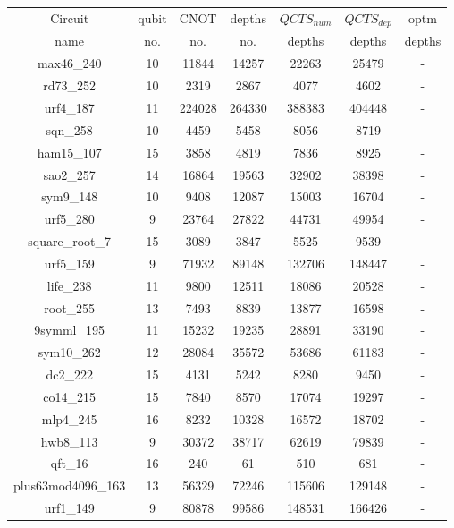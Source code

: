 \documentclass[runningheads]{llncs}
\begin{document}
								\begin{table}[H]
									\begin{center}  
									\begin{tabular}{|c|c|c|c|c|c|c|}
									\hline
									Circuit &  qubit  & CNOT &depths &$QCTS_{num}$& $QCTS_{dep}$  & optm 	  	\\
									 name	&   no. 	&	no. & no. & depths&  depths &  depths 	\\
									\hline
									max46\_240 & 10 & 11844 & 14257 & 22263 & 25479 & - \\
									rd73\_252 & 10 & 2319 & 2867 & 4077 & 4602 & - \\
									urf4\_187 & 11 & 224028 & 264330 & 388383 & 404448 & - \\
									sqn\_258 & 10 & 4459 & 5458 & 8056 & 8719 & - \\
									ham15\_107 & 15 & 3858 & 4819 & 7836 & 8925 & - \\
									sao2\_257 & 14 & 16864 & 19563 & 32902 & 38398 & - \\
									sym9\_148 & 10 & 9408 & 12087 & 15003 & 16704 & - \\
									urf5\_280 & 9 & 23764 & 27822 & 44731 & 49954 & - \\
									square\_root\_7 & 15 & 3089 & 3847 & 5525 & 9539 & - \\
									urf5\_159 & 9 & 71932 & 89148 & 132706 & 148447 & - \\
									life\_238 & 11 & 9800 & 12511 & 18086 & 20528 & - \\
									root\_255 & 13 & 7493 & 8839 & 13877 & 16598 & - \\
									9symml\_195 & 11 & 15232 & 19235 & 28891 & 33190 & - \\
									sym10\_262 & 12 & 28084 & 35572 & 53686 & 61183 & - \\
									dc2\_222 & 15 & 4131 & 5242 & 8280 & 9450 & - \\
									co14\_215 & 15 & 7840 & 8570 & 17074 & 19297 & - \\
									mlp4\_245 & 16 & 8232 & 10328 & 16572 & 18702 & - \\
									hwb8\_113 & 9 & 30372 & 38717 & 62619 & 79839 & - \\
									qft\_16 & 16 & 240 & 61 & 510 & 681 & - \\
									plus63mod4096\_163 & 13 & 56329 & 72246 & 115606 & 129148 & - \\
									urf1\_149 & 9 & 80878 & 99586 & 148531 & 166426 & - \\

\end{tabular}
\end{center}
\end{table}
\end{document}

